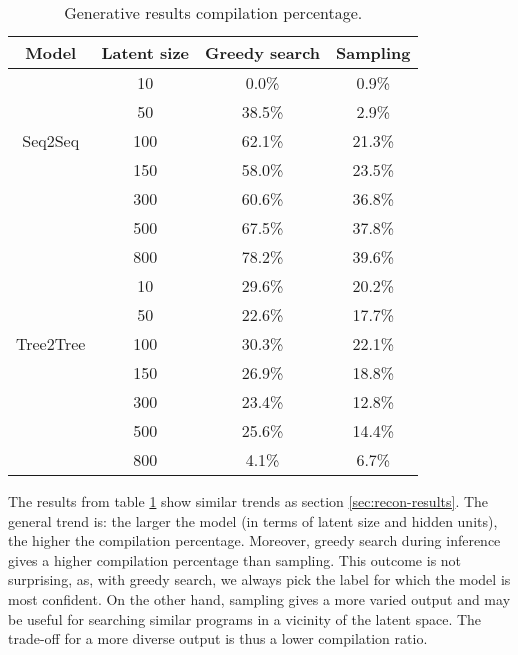 \begin{table}[ht!]
\centering
\begingroup
\setlength{\tabcolsep}{3pt} %
\renewcommand{\arraystretch}{1.4} %
\begin{tabular}{cccc}
\textbf{Model}   & \textbf{Latent size} & \textbf{Greedy search} & \textbf{Sampling} \\ \hline
\multirow{5}{*}{Seq2Seq}    &   10   &  0.0\%   & 0.9\%  \\
                            &   50   &   38.5\%    &  2.9\%   \\
                            &   100   &   62.1\%   &  21.3\%     \\
                            &   150   &   58.0\%  &     23.5\%        \\
                            &   300   &  60.6\%  &  36.8\%   \\   
                            &   500   &  67.5\% & 37.8\% \\
                            &   800   & 78.2\%  & 39.6\% \\\hline
\multirow{5}{*}{Tree2Tree}  &   10   &   29.6\%   & 20.2\% \\
                            &   50    & 22.6\%   &  17.7\%    \\
                            &   100    & 30.3\%  &       22.1\%      \\
                            &   150  &  26.9\%  &   18.8\%     \\
                            &   300  & 23.4\%  & 12.8\%    \\   
                            &   500 & 25.6\%  & 14.4\%\\
                            &   800   &  4.1\% & 6.7\% \\
\end{tabular}
\endgroup
\caption{Generative results compilation percentage.}
\label{tab:gen_results}
\end{table}




The results from table \ref{tab:gen_results} show similar trends as section \ref{sec:recon-results}. The general trend is: the larger the model (in terms of latent size and hidden units), the higher the compilation percentage. Moreover, greedy search during inference gives a higher compilation percentage than sampling. This outcome is not surprising, as, with greedy search, we always pick the label for which the model is most confident. On the other hand, sampling gives a more varied output and may be useful for searching similar programs in a vicinity of the latent space. The trade-off for a more diverse output is thus a lower compilation ratio. 

